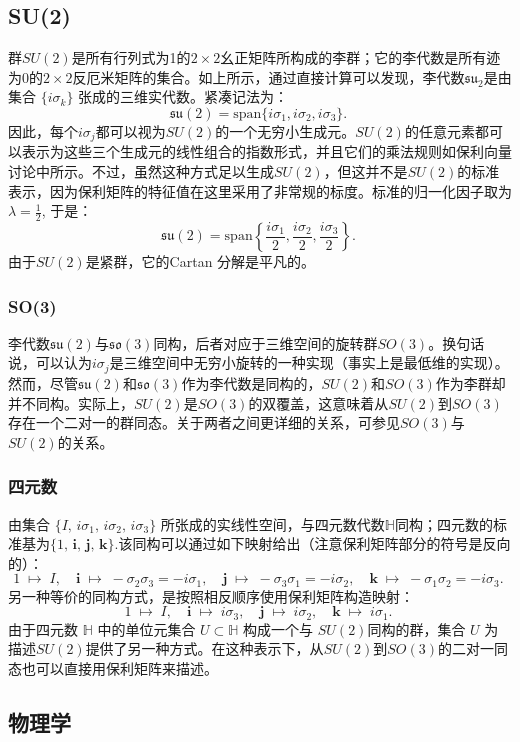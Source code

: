\subsection{SU(2)}
群$SU(2)$是所有行列式为1的$2\times2$幺正矩阵所构成的李群；它的李代数是所有迹为0的$2\times2$反厄米矩阵的集合。如上所示，通过直接计算可以发现，李代数$\mathfrak{su}_2$是由集合 $\{ i\sigma_k \}$ 张成的三维实代数。紧凑记法为：
$$
\mathfrak{su}(2) = \text{span} \{ i\sigma_1, i\sigma_2, i\sigma_3 \}.
~
$$
因此，每个$i\sigma_j$都可以视为$SU(2)$的一个无穷小生成元。$SU(2)$的任意元素都可以表示为这些三个生成元的线性组合的指数形式，并且它们的乘法规则如保利向量讨论中所示。不过，虽然这种方式足以生成$SU(2)$，但这并不是$SU(2)$的标准表示，因为保利矩阵的特征值在这里采用了非常规的标度。标准的归一化因子取为$\lambda = \frac{1}{2}$,
于是：
$$
\mathfrak{su}(2) = \text{span} \left\{ \frac{i\sigma_1}{2}, \frac{i\sigma_2}{2}, \frac{i\sigma_3}{2} \right\}.~
$$
由于$SU(2)$是紧群，它的Cartan 分解是平凡的。
\subsubsection{SO(3)}
李代数$\mathfrak{su}(2)$与$\mathfrak{so}(3)$同构，后者对应于三维空间的旋转群$SO(3)$。换句话说，可以认为$i\sigma_j$是三维空间中无穷小旋转的一种实现（事实上是最低维的实现）。然而，尽管$\mathfrak{su}(2)$和$\mathfrak{so}(3)$作为李代数是同构的，$SU(2)$和$SO(3)$作为李群却并不同构。实际上，$SU(2)$是$SO(3)$的双覆盖，这意味着从$SU(2)$到$SO(3)$存在一个二对一的群同态。关于两者之间更详细的关系，可参见$SO(3)$与$SU(2)$的关系。
\subsubsection{四元数}
由集合 $\{I,\, i\sigma_1,\, i\sigma_2,\, i\sigma_3\}$ 所张成的实线性空间，与四元数代数$\mathbb{H}$同构；四元数的标准基为$\{1,\,\mathbf{i},\,\mathbf{j},\,\mathbf{k}\}$.该同构可以通过如下映射给出（注意保利矩阵部分的符号是反向的）：
$$
1 \;\mapsto\; I, \quad 
\mathbf{i} \;\mapsto\; -\sigma_2\sigma_3 = -i\sigma_1, \quad
\mathbf{j} \;\mapsto\; -\sigma_3\sigma_1 = -i\sigma_2, \quad
\mathbf{k} \;\mapsto\; -\sigma_1\sigma_2 = -i\sigma_3.~
$$
另一种等价的同构方式，是按照相反顺序使用保利矩阵构造映射：
$$
1 \;\mapsto\; I, \quad
\mathbf{i} \;\mapsto\; i\sigma_3, \quad
\mathbf{j} \;\mapsto\; i\sigma_2, \quad
\mathbf{k} \;\mapsto\; i\sigma_1.~
$$
由于四元数 $\mathbb{H}$ 中的单位元集合 $U \subset \mathbb{H}$ 构成一个与 $SU(2)$同构的群，集合 $U$ 为描述$SU(2)$提供了另一种方式。在这种表示下，从$SU(2)$到$SO(3)$的二对一同态也可以直接用保利矩阵来描述。
\subsection{物理学}
